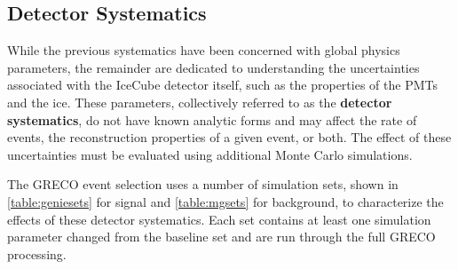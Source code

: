\label{subsec:detector_systematics}
\subsection{Detector Systematics}
While the previous systematics have been concerned with global physics parameters, the remainder are dedicated to understanding the uncertainties associated with the IceCube detector itself, such as the properties of the PMTs and the ice.
These parameters, collectively referred to as the \textbf{detector systematics}, do not have known analytic forms and may affect the rate of events, the reconstruction properties of a given event, or both.
The effect of these uncertainties must be evaluated using additional Monte Carlo simulations.

The GRECO event selection uses a number of simulation sets, shown in \ref{table:geniesets} for signal and \ref{table:mgsets} for background, to characterize the effects of these detector systematics.
Each set contains at least one simulation parameter changed from the baseline set and are run through the full GRECO processing.

